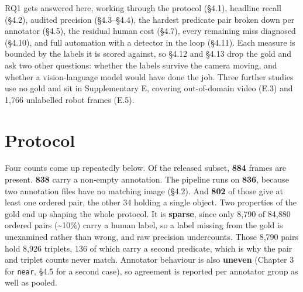 
RQ1 gets answered here, working through the protocol (\S{}4.1), headline recall (\S{}4.2), audited precision (\S{}4.3--\S{}4.4), the hardest predicate pair broken down per annotator (\S{}4.5), the residual human cost (\S{}4.7), every remaining miss diagnosed (\S{}4.10), and full automation with a detector in the loop (\S{}4.11). Each measure is bounded by the labels it is scored against, so \S{}4.12 and \S{}4.13 drop the gold and ask two other questions: whether the labels survive the camera moving, and whether a vision-language model would have done the job. Three further studies use no gold and sit in Supplementary E, covering out-of-domain video (E.3) and 1,766 unlabelled robot frames (E.5).

\section{Protocol}

Four counts come up repeatedly below. Of the released subset, \textbf{884} frames are present. \textbf{838} carry a non-empty annotation. The pipeline runs on \textbf{836}, because two annotation files have no matching image (\S{}4.2). And \textbf{802} of those give at least one ordered pair, the other 34 holding a single object. Two properties of the gold end up shaping the whole protocol. It is \textbf{sparse}, since only 8,790 of 84,880 ordered pairs (\textasciitilde{}10\%) carry a human label, so a label missing from the gold is unexamined rather than wrong, and raw precision undercounts. Those 8,790 pairs hold 8,926 triplets, 136 of which carry a second predicate, which is why the pair and triplet counts never match. Annotator behaviour is also \textbf{uneven} (Chapter 3 for \texttt{near}, \S{}4.5 for a second case), so agreement is reported per annotator group as well as pooled.

